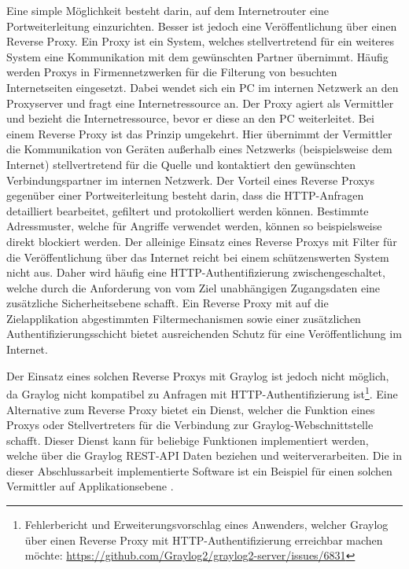 Eine simple Möglichkeit besteht darin, auf dem Internetrouter eine Portweiterleitung einzurichten. Besser ist jedoch eine Veröffentlichung über einen Reverse Proxy. Ein Proxy ist ein System, welches stellvertretend für ein weiteres System eine Kommunikation mit dem gewünschten Partner übernimmt. Häufig werden Proxys in Firmennetzwerken für die Filterung von besuchten Internetseiten eingesetzt. Dabei wendet sich ein PC im internen Netzwerk an den Proxyserver und fragt eine Internetressource an. Der Proxy agiert als Vermittler und bezieht die Internetressource, bevor er diese an den PC weiterleitet. Bei einem Reverse Proxy ist das Prinzip umgekehrt. Hier übernimmt der Vermittler die Kommunikation von Geräten außerhalb eines Netzwerks (beispielsweise dem Internet) stellvertretend für die Quelle und kontaktiert den gewünschten Verbindungspartner im internen Netzwerk. Der Vorteil eines Reverse Proxys gegenüber einer Portweiterleitung besteht darin, dass die HTTP-Anfragen detailliert bearbeitet, gefiltert und protokolliert werden können. Bestimmte Adressmuster, welche für Angriffe verwendet werden, können so beispielsweise direkt blockiert werden. Der alleinige Einsatz eines Reverse Proxys mit Filter für die Veröffentlichung über das Internet reicht bei einem schützenswerten System nicht aus. Daher wird häufig eine HTTP-Authentifizierung zwischengeschaltet, welche durch die Anforderung von vom Ziel unabhängigen Zugangsdaten eine zusätzliche Sicherheitsebene schafft. Ein Reverse Proxy mit auf die Zielapplikation abgestimmten Filtermechanismen sowie einer zusätzlichen Authentifizierungsschicht bietet ausreichenden Schutz für eine Veröffentlichung im Internet. 

Der Einsatz eines solchen Reverse Proxys mit Graylog ist jedoch nicht möglich, da Graylog nicht kompatibel zu Anfragen mit HTTP-Authentifizierung ist\footnote{Fehlerbericht und Erweiterungsvorschlag eines Anwenders, welcher Graylog über einen Reverse Proxy mit HTTP-Authentifizierung erreichbar machen möchte: \url{https://github.com/Graylog2/graylog2-server/issues/6831}}. Eine Alternative zum Reverse Proxy bietet ein Dienst, welcher die Funktion eines Proxys oder Stellvertreters für die Verbindung zur Graylog-Webschnittstelle schafft. Dieser Dienst kann für beliebige Funktionen implementiert werden, welche über die Graylog REST-API Daten beziehen und weiterverarbeiten. Die in dieser Abschlussarbeit implementierte Software ist ein Beispiel für einen solchen Vermittler auf Applikationsebene \cite[S. 12 ff.]{bsi-websec}.
